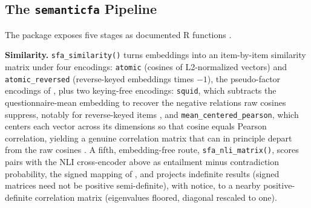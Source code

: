 \subsection{The \texttt{semanticfa} Pipeline}

The package \citep{yanitski-westbury-2026} exposes five stages as documented R functions \citep{rcoreteam-2025}.

\textbf{Similarity.} \texttt{sfa\_similarity()} turns embeddings into an item-by-item similarity matrix under four encodings: \texttt{atomic} (cosines of L2-normalized vectors) and \texttt{atomic\_reversed} (reverse-keyed embeddings times $-1$), the pseudo-factor encodings of \citet{guenole-etal-2025}, plus two keying-free encodings: \texttt{squid}, which subtracts the questionnaire-mean embedding to recover the negative relations raw cosines suppress, notably for reverse-keyed items \citep{pellert-etal-2026}, and \texttt{mean\_centered\_pearson}, which centers each vector across its dimensions so that cosine equals Pearson correlation, yielding a genuine correlation matrix that can in principle depart from the raw cosines \citep{pokropek-2026}. A fifth, embedding-free route, \texttt{sfa\_nli\_matrix()}, scores pairs with the NLI cross-encoder above \citep{bowman-etal-2015} as entailment minus contradiction probability, the signed mapping of \citet{hommel-arslan-2025}, and projects indefinite results (signed matrices need not be positive semi-definite), with notice, to a nearby positive-definite correlation matrix (eigenvalues floored, diagonal rescaled to one).

